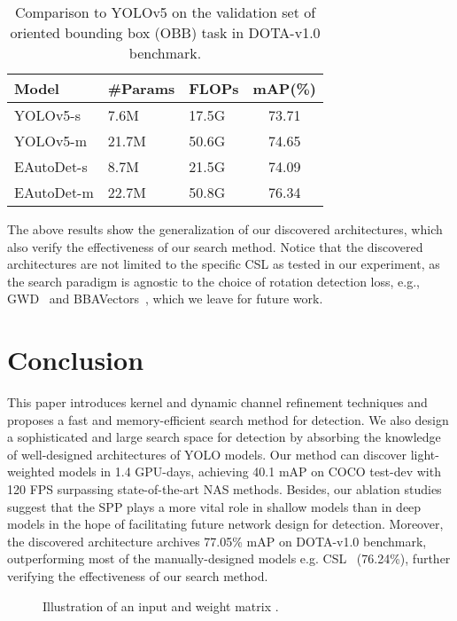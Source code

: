 \documentclass[letterpaper]{article} \usepackage{aaai22}  \usepackage{times}  \usepackage{helvet}  \usepackage{courier}  \usepackage[hyphens]{url}  \usepackage{graphicx} \urlstyle{rm} \def\UrlFont{\rm}  \usepackage{natbib}  \usepackage{caption} \DeclareCaptionStyle{ruled}{labelfont=normalfont,labelsep=colon,strut=off} \frenchspacing  \setlength{\pdfpagewidth}{8.5in}  \setlength{\pdfpageheight}{11in}
\begin{document}
\begin{table}[tb]
    \centering
\caption{Comparison to YOLOv5 on the validation set of oriented bounding box (OBB) task in DOTA-v1.0 benchmark.}
    \label{tab:oriented_results_yolo}
    \vspace{-8pt}
\begin{tabular}{lllc}
        \toprule
        \textbf{Model}    & \textbf{\#Params} & \textbf{FLOPs} & \textbf{mAP(\%)} \\ 
        \hline
        YOLOv5-s & 7.6M & 17.5G & 73.71 \\
        YOLOv5-m & 21.7M & 50.6G & 74.65 \\
        EAutoDet-s & 8.7M & 21.5G & 74.09 \\
        EAutoDet-m & 22.7M & 50.8G & 76.34 \\
        \bottomrule
        \end{tabular}
\end{table}
The above results show the generalization of our discovered architectures, which also verify the effectiveness of our search method. Notice that the discovered architectures are not limited to the specific CSL as tested in our experiment, as the search paradigm is agnostic to the choice of rotation detection loss, e.g., GWD~\cite{yang2021rethinking} and BBAVectors~\cite{yi2021oriented}, which we leave for future work.




\section{Conclusion}
This paper introduces kernel and dynamic channel refinement techniques and proposes a fast and memory-efficient search method for detection. We also design a sophisticated and large search space for detection by absorbing the knowledge of well-designed architectures of YOLO models. Our method can discover light-weighted models in 1.4 GPU-days, achieving 40.1 mAP on COCO test-dev with 120 FPS surpassing state-of-the-art NAS methods. Besides, our ablation studies suggest that the SPP plays a more vital role in shallow models than in deep models in the hope of facilitating future network design for detection.
Moreover, the discovered architecture archives 77.05\% mAP on DOTA-v1.0 benchmark, outperforming most of the manually-designed models e.g. CSL~\cite{csl} (76.24\%), further verifying the effectiveness of our search method.


\appendix
\begin{figure}[tb]
\begin{center}
\vspace{-10pt}
\caption{Illustration of an input and weight matrix .
}
\label{fig:input_weight}
\end{center}
\end{figure} 
\end{document}
